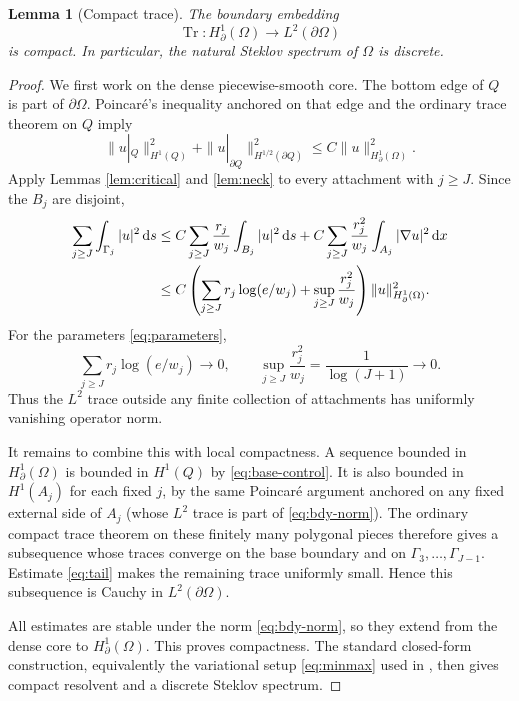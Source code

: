 \documentclass[11pt]{article}
\newtheorem{lemma}{Lemma}
\newcommand{\Om}{\Omega}
\newcommand{\dd}{\,\mathrm d}
\newcommand{\Tr}{\operatorname{Tr}}
\begin{document}
\begin{lemma}[Compact trace]\label{lem:compact}
The boundary embedding
\[
 \Tr:H^1_{\partial}(\Om)\longrightarrow L^2(\partial\Om)
\]
is compact.  In particular, the natural Steklov spectrum of $\Om$ is
discrete.
\end{lemma}

\begin{proof}
We first work on the dense piecewise-smooth core.  The bottom edge of $Q$ is
part of $\partial\Om$.  Poincar\'e's inequality anchored on that edge and the
ordinary trace theorem on $Q$ imply
\begin{equation}\label{eq:base-control}
 \|u|_Q\|_{H^1(Q)}^2+
 \|u|_{\partial Q}\|_{H^{1/2}(\partial Q)}^2
 \le C\|u\|_{H^1_{\partial}(\Om)}^2.
\end{equation}
Apply Lemmas \ref{lem:critical} and \ref{lem:neck} to every attachment with
$j\ge J$.  Since the $B_j$ are disjoint,
\begin{align}
 \sum_{j\ge J}\int_{\Gamma_j}|u|^2\dd s
 &\le C\sum_{j\ge J}\frac{r_j}{w_j}
       \int_{B_j}|u|^2\dd s
   +C\sum_{j\ge J}\frac{r_j^2}{w_j}
       \int_{A_j}|\nabla u|^2\dd x \notag\\
 &\le C\left(\sum_{j\ge J}r_j\log(e/w_j)
       +\sup_{j\ge J}\frac{r_j^2}{w_j}\right)
       \|u\|_{H^1_{\partial}(\Om)}^2.\label{eq:tail}
\end{align}
For the parameters \eqref{eq:parameters},
\[
 \sum_{j\ge J}r_j\log(e/w_j)\longrightarrow0,
 \qquad
 \sup_{j\ge J}\frac{r_j^2}{w_j}
 =\frac1{\log(J+1)}\longrightarrow0.
\]
Thus the $L^2$ trace outside any finite collection of attachments has
uniformly vanishing operator norm.

It remains to combine this with local compactness.  A sequence bounded in
$H^1_{\partial}(\Om)$ is bounded in $H^1(Q)$ by
\eqref{eq:base-control}.  It is also bounded in $H^1(A_j)$ for each fixed
$j$, by the same Poincar\'e argument anchored on any fixed external side of
$A_j$ (whose $L^2$ trace is part of \eqref{eq:bdy-norm}).
The ordinary compact trace theorem on these finitely many polygonal pieces
therefore gives a subsequence whose traces converge on the base boundary and
on $\Gamma_3,\ldots,\Gamma_{J-1}$.  Estimate \eqref{eq:tail} makes the
remaining trace uniformly small.  Hence this subsequence is Cauchy in
$L^2(\partial\Om)$.

All estimates are stable under the norm \eqref{eq:bdy-norm}, so they extend
from the dense core to $H^1_{\partial}(\Om)$.  This proves compactness.  The
standard closed-form construction, equivalently the variational setup
\eqref{eq:minmax} used in \cite{KLP}, then gives compact resolvent and a
discrete Steklov spectrum.
\end{proof}
\end{document}
